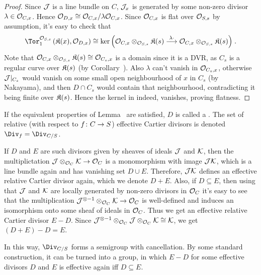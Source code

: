 \documentclass[a4paper,parskip=half,numbers=enddot, DIV=12]{scrreprt}
\begin{document}
\begin{proof}
	Since $\mathcal{J}$ is a line bundle on $C$, $\mathcal{J}_x$ is generated by some non-zero divisor $\lambda\in\mathcal{O}_{C,x}$. Hence $\mathcal{O}_{D,x}\cong \mathcal{O}_{C,x}/\lambda\mathcal{O}_{C,x}$. Since $\mathcal{O}_{C,x}$ is flat over $\mathcal{O}_{S,s}$ by assumption, it's easy to check that
	\begin{align}\lbl{eq:TorKer}
		\Tor_1^{\Oo_{S,s}}\left(\KK(x),\Oo_{D,x}\right)\cong \ker\Big(\Oo_{C,x}\otimes_{\Oo_{S,s}}\KK(s)\morphism[\lambda\cdot]\Oo_{C,x}\otimes_{\Oo_{S,s}}\KK(s)\Big)\;.
	\end{align}
	Note that $\mathcal{O}_{C,x}\otimes_{\mathcal{O}_{S,s}}\mathfrak{K}(s)\cong \mathcal{O}_{C_s,x}$ is a domain since it is a DVR, as $C_s$ is a regular curve over $\mathfrak{K}(s)$ (by Corollary~). Also $\lambda$ can't vanish in $\mathcal{O}_{C_s,x}$, otherwise $\mathcal{J}|_{C_s}$ would vanish on some small open neighbourhood of $x$ in $C_s$ (by Nakayama), and then $D\cap C_s$ would contain that neighbourhood, contradicting it being finite over $\mathfrak{K}(s)$. Hence the kernel in  indeed, vanishes, proving flatness.
\end{proof}
\begin{defi}
	If the equivalent properties of Lemma~ are satisfied, $D$ is called a . The set of relative (with respect to $f\colon C\morphism S$) effective Cartier divisors is denoted $\Div_f=\Div_{C/S}$.
\end{defi}
\begin{rem}
	If $D$ and $E$ are such divisors given by sheaves of ideals $\mathcal{J}$ and $\mathcal{K}$, then the multiplictation $\Jj\otimes_{\Oo_C}\Kk \morphism\Oo_C$ is a monomorphism with image $\mathcal{J}\mathcal{K}$, which is a line bundle again and has vanishing set $D\cup E$. Therefore, $\mathcal{J}\mathcal{K}$ defines an effective relative Cartier divisor again, which we denote $D+E$. Also, if $D\subseteq E$, then using that $\mathcal{J}$ and $\mathcal{K}$ are locally generated by non-zero divisors in $\mathcal{O}_C$ it's easy to see that the multiplication $\Jj^{\otimes -1}\otimes_{\Oo_C}\Kk\morphism \Oo_C$ is well-defined and induces an isomorphism onto some sheaf of ideals in $\mathcal{O}_C$. Thus we get an effective relative Cartier divisor $E-D$. Since $\mathcal{J}^{\otimes -1}\otimes_{\mathcal{O}_C}\mathcal{J}\otimes_{\mathcal{O}_C}\mathcal{K}\cong \mathcal{K}$, we get $(D+E)-D=E$.
		
	In this way, $\Div_{C/S}$ forms a semigroup with cancellation. By some standard construction, it can be turned into a group, in which $E-D$ for some effective divisors $D$ and $E$ is effective again iff $D\subseteq E$.
\end{rem}
\end{document}
